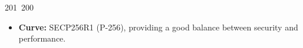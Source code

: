 201~200~\documentclass{article}
\begin{document}
	                                                                                                                                                                                                                                                                                                	                                                                                                                                        	    	                                                                                                	                                                                                                                                                                                                                                                                                                                                	                                                                        	                                                                        	                                                                                                                                        	                                                                                                                                                                                                                        	                                                                                    \begin{itemize}
	                                                                                                                                                                                                                                                                                                	                                                                                                                                        	    	                                                                                                	                                                                                                                                                                                                                                                                                                                                	                                                                        	                                                                        	                                                                                                                                        	                                                                                                                                                                                                                        	                                                                                        \item \textbf{Curve:} SECP256R1 (P-256), providing a good balance between security and performance.

\end{itemize}
\end{document}
